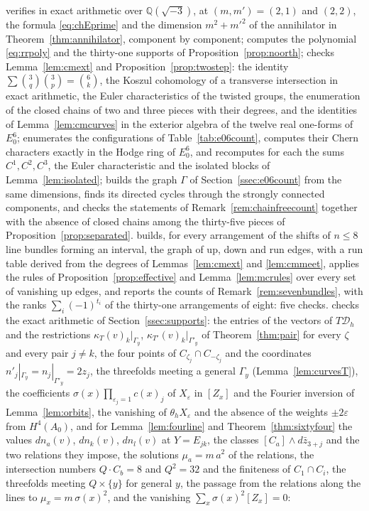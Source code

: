 \documentclass[11pt,reqno]{amsart}
\numberwithin{equation}{section}
\theoremstyle{plain}
\theoremstyle{definition}
\newcommand{\QQ}{\mathbb{Q}}
\newcommand{\cD}{\mathcal{D}}
\begin{document}
 verifies in exact arithmetic over $\QQ(\sqrt{-3})$, at $(m,m')=(2,1)$ and $(2,2)$, the formula \eqref{eq:chEprime} and the dimension $m^{2}+m'^{2}$ of the annihilator in Theorem~\ref{thm:annihilator}, component by component;  computes the polynomial \eqref{eq:rrpoly} and the thirty-one supports of Proposition~\ref{prop:noorth};  checks Lemma~\ref{lem:cmext} and Proposition~\ref{prop:twostep}: the identity $\sum\binom{3}{q}\binom{3}{p}=\binom{6}{k}$, the Koszul cohomology of a transverse intersection in exact arithmetic, the Euler characteristics of the twisted groups, the enumeration of the closed chains of two and three pieces with their degrees, and the identities of Lemma~\ref{lem:cmcurves} in the exterior algebra of the twelve real one-forms of $E_{0}^{6}$;  enumerates the configurations of Table~\ref{tab:e06count}, computes their Chern characters exactly in the Hodge ring of $E_{0}^{6}$, and recomputes for each the sums $C^{1},C^{2},C^{3}$, the Euler characteristic and the isolated blocks of Lemma~\ref{lem:isolated};  builds the graph $\Gamma$ of Section~\ref{ssec:e06count} from the same dimensions, finds its directed cycles through the strongly connected components, and checks the statements of Remark~\ref{rem:chainfreecount} together with the absence of closed chains among the thirty-five pieces of Proposition~\ref{prop:separated}.  builds, for every arrangement of the shifts of $n\le8$ line bundles forming an interval, the graph of up, down and run edges, with a run table derived from the degrees of Lemmas~\ref{lem:cmext} and \ref{lem:cmmeet}, applies the rules of Proposition~\ref{prop:effective} and Lemma~\ref{lem:mcrules} over every set of vanishing up edges, and reports the counts of Remark~\ref{rem:sevenbundles}, with the ranks $\sum_{i}(-1)^{t_{i}}$ of the thirty-one arrangements of eight: five checks.  checks the exact arithmetic of Section~\ref{ssec:supports}: the entries of the vectors of $T\cD_{h}$ and the restrictions $\kappa_{T}(v)_{k}|_{\Gamma_{y}}$, $\kappa_{T'}(v)_{k}|_{\Gamma'_{y}}$ of Theorem~\ref{thm:pair} for every $\zeta$ and every pair $j\ne k$, the four points of $C_{\zeta_{j}}\cap C_{-\zeta_{j}}$ and the coordinates $n'_{j}|_{\Gamma_{y}}=n_{j}|_{\Gamma'_{y}}=2z_{j}$, the threefolds meeting a general $\Gamma_{y}$ (Lemma~\ref{lem:curvesT}), the coefficients $\sigma(x)\prod_{\varepsilon_{j}=1}c(x)_{j}$ of $X_{\varepsilon}$ in $[Z_{x}]$ and the Fourier inversion of Lemma~\ref{lem:orbits}, the vanishing of $\theta_{h}X_{\varepsilon}$ and the absence of the weights $\pm2\varepsilon$ from $H^{4}(A_{0})$, and for Lemma~\ref{lem:fourline} and Theorem~\ref{thm:sixtyfour} the values $dn_{a}(v)$, $dn_{k}(v)$, $dn_{l}(v)$ at $Y=E_{jk}$, the classes $[C_{a}]\wedge d\bar z_{3+j}$ and the two relations they impose, the solutions $\mu_{a}=m\,a^{2}$ of the relations, the intersection numbers $Q\cdot C_{b}=8$ and $Q^{2}=32$ and the finiteness of $C_{1}\cap C_{i}$, the threefolds meeting $Q\times\{y\}$ for general $y$, the passage from the relations along the lines to $\mu_{x}=m\,\sigma(x)^{2}$, and the vanishing $\sum_{x}\sigma(x)^{2}[Z_{x}]=0$: 
\end{document}
